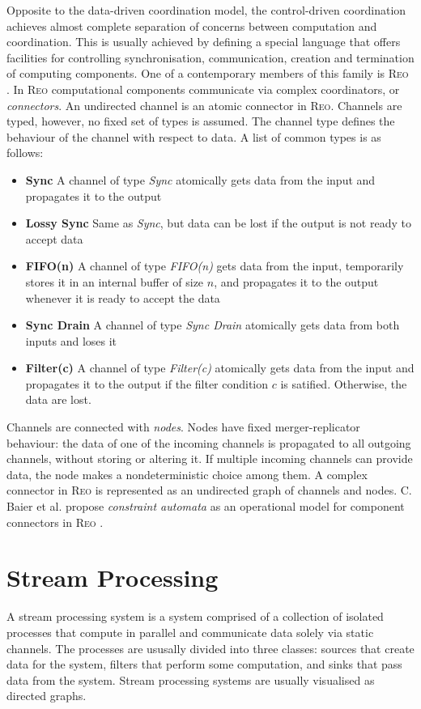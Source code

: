 Opposite to the data-driven coordination model, the control-driven coordination achieves almost complete separation of concerns between computation and coordination. This is usually achieved by defining a special language that offers facilities for controlling synchronisation, communication, creation and termination of computing components. One of a contemporary members of this family is \textsc{Reo} \cite{Reo_Arbab04}. In \textsc{Reo} computational components communicate via complex coordinators, or \emph{connectors}. An undirected channel is an atomic connector in \textsc{Reo}. Channels are typed, however, no fixed set of types is assumed. The channel type defines the behaviour of the channel with respect to data. A list of common types is as follows:
\begin{itemize}
\item \textbf{Sync} A channel of type \emph{Sync} atomically gets data from the input and propagates it to the output
\item \textbf{Lossy Sync} Same as \emph{Sync}, but data can be lost if the output is not ready to accept data
\item \textbf{FIFO(n)} A channel of type \emph{FIFO(n)} gets data from the input, temporarily stores it in an internal buffer of size $n$, and propagates it to the output whenever it is ready to accept the data
\item \textbf{Sync Drain} A channel of type \emph{Sync Drain} atomically gets data from both inputs and loses it
\item \textbf{Filter(c)} A channel of type \emph{Filter(c)} atomically gets data from the input and propagates it to the output if the filter condition $c$ is satified. Otherwise, the data are lost.
\end{itemize}
Channels are connected with \emph{nodes}. Nodes have fixed merger-replicator behaviour: the data of one of the incoming channels is propagated to all outgoing channels, without storing or altering it. If multiple incoming channels can provide data, the node makes a nondeterministic choice among them. A complex connector in \textsc{Reo} is represented as an undirected graph of channels and nodes. C. Baier et al. propose \emph{constraint automata} as an operational model for component connectors in \textsc{Reo} \cite{baier_ca}.


    \section{Stream Processing}
A stream processing system is a system comprised of a collection of isolated processes that compute in parallel and communicate data solely via static channels. The processes are ususally divided into three classes: sources that create data for the system, filters that perform some computation, and sinks that pass data from the system. Stream processing systems are usually visualised as directed graphs.

